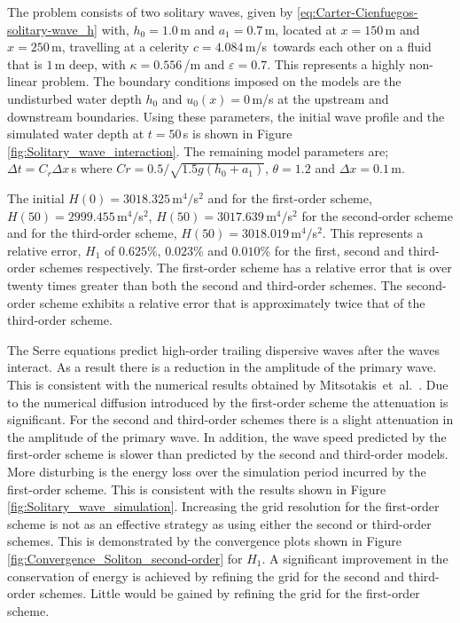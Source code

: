 \documentclass[preprint,sort&compress,1p]{article}
\begin{document}
The problem consists of two solitary waves, given by \eqref{eq:Carter-Cienfuegos-solitary-wave_h} with, $h_0 = 1.0$\,m and $a_1 = 0.7$\,m, located at $x = 150$\,m and $x = 250$\,m, travelling  at a celerity  $c = 4.084$\,m/s~towards each other on a fluid that is $1$\,m deep, with $\kappa = 0.556$\,/m and $\varepsilon = 0.7$. This represents a highly non-linear problem.
The boundary conditions imposed on the models are the undisturbed water depth $h_0$ and $u_0(x) = 0$\,m/s at the upstream and downstream boundaries. Using these parameters, the initial wave profile and the simulated water depth at $t = 50$\,s is shown in Figure \ref{fig:Solitary_wave_interaction}. The remaining model parameters are; $\Delta t = C_r\Delta x$\,s where $Cr = 0.5/\sqrt{1.5g(h_0 + a_1)}$, $\theta = 1.2$ and $\Delta x = 0.1$\,m.

The initial $H(0) = 3018.325$\,m$^4/$s$^2$ and for the first-order scheme, $H(50) = 2999.455$\,m$^4/$s$^2$, $H(50) = 3017.639$\,m$^4/$s$^2$ for the second-order scheme and for the third-order scheme, $H(50) = 3018.019$\,m$^4/$s$^2$. This represents a relative error, $H_1$ of $0.625\%$, $0.023\%$ and $0.010\%$ for the first, second and third-order schemes respectively. The first-order scheme has a relative error that is over twenty times greater than both the second and third-order schemes. The second-order scheme exhibits a relative error that is approximately twice that of the third-order scheme.

The Serre equations predict high-order trailing dispersive waves after the waves interact. As a result there is a reduction in the amplitude of the primary wave. This is consistent with the numerical results obtained by Mitsotakis~et~al.~\cite{Mitsotakis-D-et-al-2014-166}.
Due to the numerical diffusion introduced by the first-order scheme the attenuation is significant. For the second and third-order schemes there is a slight attenuation in the amplitude of the primary wave. In addition, the wave speed predicted by the first-order scheme is slower than predicted by the second and third-order models. More disturbing is the energy loss over the simulation period incurred by the first-order scheme. This is consistent with the results shown in Figure \ref{fig:Solitary_wave_simulation}. Increasing the grid resolution for the first-order scheme is not as an effective strategy as using either the second or third-order schemes. This is demonstrated by the convergence plots shown in Figure \ref{fig:Convergence_Soliton_second-order} for $H_1$. A significant improvement in the conservation of energy is achieved by refining the grid for the second and third-order schemes. Little would be gained by refining the grid for the first-order scheme.
\end{document}
